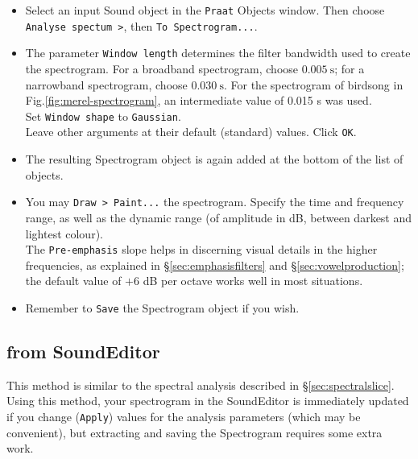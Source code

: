 \documentclass[
]{book}
\begin{document}
\begin{itemize}
\item
  Select an input Sound object in the \texttt{Praat} Objects window. Then choose \texttt{Analyse\ spectum\ \textgreater{}}, then \texttt{To\ Spectrogram...}.
\item
  The parameter \texttt{Window\ length} determines the filter bandwidth used to create the spectrogram. For a broadband spectrogram, choose \(0.005\ \textrm{s}\); for a narrowband spectrogram, choose \(0.030\ \textrm{s}\).
  For the spectrogram of birdsong in Fig.\ref{fig:merel-spectrogram}, an intermediate value of 0.015 s was used.\\
  Set \texttt{Window\ shape} to \texttt{Gaussian}.\\
  Leave other arguments at their default (standard) values. Click \texttt{OK}.
\item
  The resulting Spectrogram object is again added at the bottom of the list of objects.
\item
  You may \texttt{Draw\ \textgreater{}\ Paint...} the spectrogram. Specify the time and frequency range, as well as the dynamic range (of amplitude in dB, between darkest and lightest colour).\\
  The \texttt{Pre-emphasis} slope helps in discerning visual details in the higher frequencies, as explained in §\ref{sec:emphasisfilters} and §\ref{sec:vowelproduction}; the default value of \(+6\) dB per octave works well in most situations.
\item
  Remember to \texttt{Save} the Spectrogram object if you wish.
\end{itemize}

\subsection{from SoundEditor}\label{sec:spectrogramsoundeditor}

This method is similar to the spectral analysis described in §\ref{sec:spectralslice}. Using this method, your spectrogram in the SoundEditor is immediately updated if you change (\texttt{Apply}) values for the analysis parameters (which may be convenient), but extracting and saving the Spectrogram requires some extra work.
\end{document}
